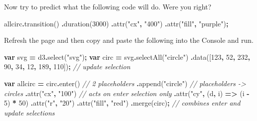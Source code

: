 \documentclass[
  openany]{book}
\newenvironment{Shaded}{\begin{snugshade}}{\end{snugshade}}
\newcommand{\CommentTok}[1]{\textcolor[rgb]{0.56,0.35,0.01}{\textit{#1}}}
\newcommand{\DecValTok}[1]{\textcolor[rgb]{0.00,0.00,0.81}{#1}}
\newcommand{\FunctionTok}[1]{\textcolor[rgb]{0.00,0.00,0.00}{#1}}
\newcommand{\KeywordTok}[1]{\textcolor[rgb]{0.13,0.29,0.53}{\textbf{#1}}}
\newcommand{\NormalTok}[1]{#1}
\newcommand{\OperatorTok}[1]{\textcolor[rgb]{0.81,0.36,0.00}{\textbf{#1}}}
\newcommand{\StringTok}[1]{\textcolor[rgb]{0.31,0.60,0.02}{#1}}
\begin{document}
Now try to predict what the following code will do. Were you right?

\begin{Shaded}
\begin{Highlighting}[]
\NormalTok{allcirc}\OperatorTok{.}\FunctionTok{transition}\NormalTok{() }
        \OperatorTok{.}\FunctionTok{duration}\NormalTok{(}\DecValTok{3000}\NormalTok{)}
        \OperatorTok{.}\FunctionTok{attr}\NormalTok{(}\StringTok{"cx"}\OperatorTok{,} \StringTok{"400"}\NormalTok{)}
        \OperatorTok{.}\FunctionTok{attr}\NormalTok{(}\StringTok{"fill"}\OperatorTok{,} \StringTok{"purple"}\NormalTok{)}\OperatorTok{;}
\end{Highlighting}
\end{Shaded}

Refresh the page and then copy and paste the following into the Console and run.

\begin{Shaded}
\begin{Highlighting}[]
\KeywordTok{var}\NormalTok{ svg }\OperatorTok{=}\NormalTok{ d3}\OperatorTok{.}\FunctionTok{select}\NormalTok{(}\StringTok{"svg"}\NormalTok{)}\OperatorTok{;}
\KeywordTok{var}\NormalTok{ circ }\OperatorTok{=}\NormalTok{ svg}\OperatorTok{.}\FunctionTok{selectAll}\NormalTok{(}\StringTok{"circle"}\NormalTok{)}
  \OperatorTok{.}\FunctionTok{data}\NormalTok{([}\DecValTok{123}\OperatorTok{,} \DecValTok{52}\OperatorTok{,} \DecValTok{232}\OperatorTok{,} \DecValTok{90}\OperatorTok{,} \DecValTok{34}\OperatorTok{,} \DecValTok{12}\OperatorTok{,} \DecValTok{189}\OperatorTok{,} \DecValTok{110}\NormalTok{])}\OperatorTok{;} \CommentTok{// update selection}
  
\KeywordTok{var}\NormalTok{ allcirc }\OperatorTok{=}\NormalTok{ circ}\OperatorTok{.}\FunctionTok{enter}\NormalTok{()  }\CommentTok{// 2 placeholders}
        \OperatorTok{.}\FunctionTok{append}\NormalTok{(}\StringTok{"circle"}\NormalTok{)  }\CommentTok{// placeholders {-}\textgreater{} circles}
          \OperatorTok{.}\FunctionTok{attr}\NormalTok{(}\StringTok{"cx"}\OperatorTok{,} \StringTok{"100"}\NormalTok{)  }\CommentTok{// acts on enter selection only}
          \OperatorTok{.}\FunctionTok{attr}\NormalTok{(}\StringTok{"cy"}\OperatorTok{,}\NormalTok{ (d}\OperatorTok{,}\NormalTok{ i) }\KeywordTok{=\textgreater{}}\NormalTok{ (i }\OperatorTok{{-}} \DecValTok{5}\NormalTok{) }\OperatorTok{*} \DecValTok{50}\NormalTok{)}
          \OperatorTok{.}\FunctionTok{attr}\NormalTok{(}\StringTok{"r"}\OperatorTok{,} \StringTok{"20"}\NormalTok{)}
          \OperatorTok{.}\FunctionTok{attr}\NormalTok{(}\StringTok{"fill"}\OperatorTok{,} \StringTok{"red"}\NormalTok{)}
          \OperatorTok{.}\FunctionTok{merge}\NormalTok{(circ)}\OperatorTok{;}  \CommentTok{// combines enter and update selections}
\end{Highlighting}
\end{Shaded}
\end{document}
